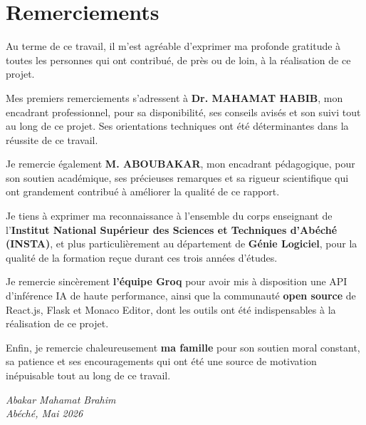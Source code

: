 \chapter*{Remerciements}

\vspace*{1cm}

Au terme de ce travail, il m'est agréable d'exprimer ma profonde gratitude à toutes les personnes qui ont contribué, de près ou de loin, à la réalisation de ce projet.

\vspace{0.5cm}

Mes premiers remerciements s'adressent à \textbf{Dr. MAHAMAT HABIB}, mon encadrant professionnel, pour sa disponibilité, ses conseils avisés et son suivi tout au long de ce projet. Ses orientations techniques ont été déterminantes dans la réussite de ce travail.

\vspace{0.5cm}

Je remercie également \textbf{M. ABOUBAKAR}, mon encadrant pédagogique, pour son soutien académique, ses précieuses remarques et sa rigueur scientifique qui ont grandement contribué à améliorer la qualité de ce rapport.

\vspace{0.5cm}

Je tiens à exprimer ma reconnaissance à l'ensemble du corps enseignant de l'\textbf{Institut National Supérieur des Sciences et Techniques d'Abéché (INSTA)}, et plus particulièrement au département de \textbf{Génie Logiciel}, pour la qualité de la formation reçue durant ces trois années d'études.

\vspace{0.5cm}

Je remercie sincèrement \textbf{l'équipe Groq} pour avoir mis à disposition une API d'inférence IA de haute performance, ainsi que la communauté \textbf{open source} de React.js, Flask et Monaco Editor, dont les outils ont été indispensables à la réalisation de ce projet.

\vspace{0.5cm}

Enfin, je remercie chaleureusement \textbf{ma famille} pour son soutien moral constant, sa patience et ses encouragements qui ont été une source de motivation inépuisable tout au long de ce travail.

\vspace{1cm}

\begin{flushright}
\textit{Abakar Mahamat Brahim}\\
\textit{Abéché, Mai 2026}
\end{flushright}